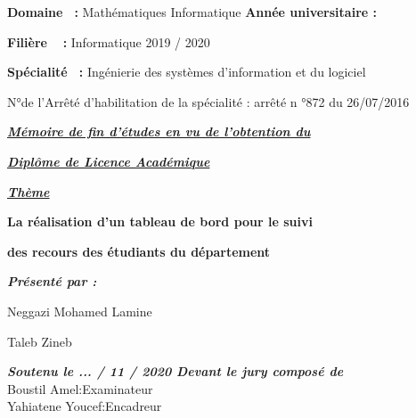 \documentclass[12pt]{report}
\begin{document}
\begin{titlepage}
    \hspace{0.2in}
    \large{\textbf{Domaine \,\; :}  Mathématiques Informatique}
    \kern 1in
    \large{\textbf{Année universitaire :}}

    \hspace{0.2in}
    \large{\textbf{Filière \quad\,\,\, :}  Informatique}
    \kern 2.65in
    2019 / 2020

    \hspace{0.2in}
    \large{\textbf{Spécialité \, :}  Ingénierie des systèmes d'information et du logiciel}

    \hspace{0.2in}
    \Large{N°de l’Arrêté d’habilitation de la spécialité : arrêté n °872 du 26/07/2016}

    \begin{center}
        \begin{large}

            \textit{\textbf{\uline{Mémoire de fin d'études en vu de l'obtention du}}}
        
            \textit{\textbf{\uline{Diplôme de Licence Académique}}}

        \end{large}

        \vspace{0.2in}

        \textit{\Huge{\textbf{\uline{Thème}}}}

        \begin{mdframed}[style=MyFrame]
            \begin{center}
            \color{BlueViolet}
              \LARGE{\textbf{La réalisation d'un tableau de bord pour le suivi}}

              \LARGE{\textbf{des recours des étudiants du département}}
            \end{center}
        \end{mdframed}
    \end{center}

    \vspace{-0.05in}

    \hspace{0.2in}
    \textit{\textbf{Présenté par :}}

    \hspace{0.2in}
    Neggazi Mohamed Lamine

    \hspace{0.2in}
    Taleb Zineb

    \begin{center}
        \vspace{-0.1in}
        \textit{\textbf{Soutenu le ... / 11 / 2020 Devant le jury composé de}}\\
        \hspace{0.584in}
        Boustil Amel\qquad :\qquad Examinateur\\
        Yahiatene Youcef\qquad :\qquad Encadreur
    \end{center}


\end{titlepage}
\end{document}
